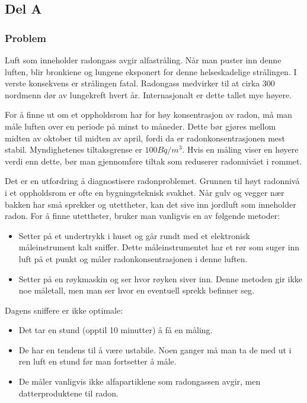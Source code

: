 \subsection{Del A}

\subsubsection{Problem}

Luft som inneholder radongass avgir alfastråling. Når man puster inn denne luften, blir bronkiene og lungene eksponert for denne helseskadelige strålingen. I verste konsekvens er strålingen fatal. Radongass medvirker til at cirka 300 nordmenn dør av lungekreft hvert år. Internasjonalt er dette tallet mye høyere.

For å finne ut om et oppholdsrom har for høy konsentrasjon av radon, må man måle luften over en periode på minst to måneder. Dette bør gjøres mellom midten av oktober til midten av april, fordi da er radonkonsentrasjonen mest stabil. Myndighetenes tiltaksgrense er $100 Bq/m^3$. Hvis en måling viser en høyere verdi enn dette, bør man gjennomføre tiltak som reduserer radonnivået i rommet.

Det er en utfordring å diagnostisere radonproblemet. Grunnen til høyt radonnivå i et oppholdsrom er ofte en bygningsteknisk svakhet. Når gulv og vegger nær bakken har små sprekker og utettheter, kan det sive inn jordluft som inneholder radon. For å finne utettheter, bruker man vanligvis en av følgende metoder:
\begin{itemize}
	\item Setter på et undertrykk i huset og går rundt med et elektronisk måleinstrument kalt sniffer. Dette måleinstrumentet har et rør som suger inn luft på et punkt og måler radonkonsentrasjonen i denne luften.
	\item Setter på en røykmaskin og ser hvor røyken siver inn. Denne metoden gir ikke noe måletall, men man ser hvor en eventuell sprekk befinner seg.
\end{itemize}

Dagens sniffere er ikke optimale:
\begin{itemize}
	\item Det tar en stund (opptil 10 minutter) å få en måling.
	\item De har en tendens til å være ustabile. Noen ganger må man ta de med ut i ren luft en stund før man fortsetter å måle.
	\item De måler vanligvis ikke alfapartiklene som radongassen avgir, men datterproduktene til radon.
\end{itemize}

